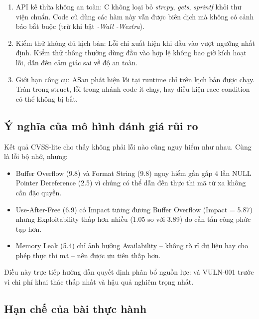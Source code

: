 \begin{enumerate}
    \item API kế thừa không an toàn: C không loại bỏ \textit{strcpy},
          \textit{gets}, \textit{sprintf} khỏi thư viện chuẩn. Code cũ dùng
          các hàm này vẫn được biên dịch mà không có cảnh báo bắt buộc (trừ
          khi bật \textit{-Wall -Wextra}).
    \item Kiểm thử không đủ kịch bản: Lỗi chỉ xuất hiện khi đầu vào vượt ngưỡng
          nhất định. Kiểm thử thông thường dùng đầu vào hợp lệ không bao giờ
          kích hoạt lỗi, dẫn đến cảm giác sai về độ an toàn.
    \item Giới hạn công cụ: ASan phát hiện lỗi tại runtime chỉ trên kịch bản
          được chạy. Tràn trong struct, lỗi trong nhánh code ít chạy, hay điều
          kiện race condition có thể không bị bắt.
\end{enumerate}

\subsection{Ý nghĩa của mô hình đánh giá rủi ro}

Kết quả CVSS-lite cho thấy không phải lỗi nào cũng nguy hiểm như nhau. Cùng
là lỗi bộ nhớ, nhưng:

\begin{itemize}
    \item Buffer Overflow (9.8) và Format String (9.8) nguy hiểm gần gấp 4 lần
          NULL Pointer Dereference (2.5) vì chúng có thể dẫn đến thực thi mã
          từ xa không cần đặc quyền.
    \item Use-After-Free (6.9) có Impact tương đương Buffer Overflow
          (Impact = 5.87) nhưng Exploitability thấp hơn nhiều (1.05 so với 3.89)
          do cần tấn công phức tạp hơn.
    \item Memory Leak (5.4) chỉ ảnh hưởng Availability -- không rò rỉ dữ liệu
          hay cho phép thực thi mã -- nên được ưu tiên thấp hơn.
\end{itemize}

Điều này trực tiếp hướng dẫn quyết định phân bổ nguồn lực: vá VULN-001 trước
vì chi phí khai thác thấp nhất và hậu quả nghiêm trọng nhất.

\subsection{Hạn chế của bài thực hành}

